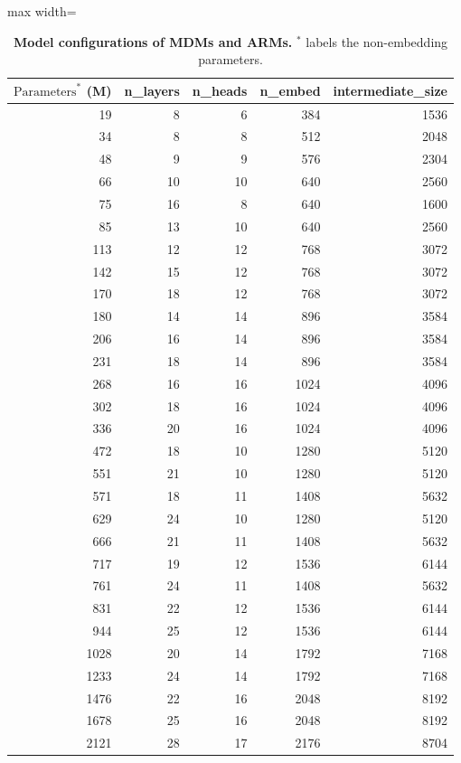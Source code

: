 \documentclass{article} %
\begin{document}
\begin{table}[t!]
    \centering
    \caption{\textbf{Model configurations of MDMs and ARMs.} $^*$ labels the non-embedding parameters.}
    \label{tab:app_model_config}
    \begin{adjustbox}{max width=\textwidth}
    \begin{tabular}{r|rrrr}
        \toprule
        $\text{Parameters}^*$ (M) & n\_layers & n\_heads & n\_embed & intermediate\_size \\
        \midrule
        19 & 8 & 6 & 384 & 1536 \\
        34 & 8 & 8 & 512 & 2048 \\
        48 & 9 & 9 & 576 & 2304 \\
        66 & 10 & 10 & 640 & 2560 \\
        75 & 16 & 8 & 640 & 1600 \\
        85 & 13 & 10 & 640 & 2560 \\
        113 & 12 & 12 & 768 & 3072 \\
        142 & 15 & 12 & 768 & 3072 \\
        170 & 18 & 12 & 768 & 3072 \\
        180 & 14 & 14 & 896 & 3584 \\
        206 & 16 & 14 & 896 & 3584 \\
        231 & 18 & 14 & 896 & 3584 \\
        268 & 16 & 16 & 1024 & 4096 \\
        302 & 18 & 16 & 1024 & 4096 \\
        336 & 20 & 16 & 1024 & 4096 \\
        472 & 18 & 10 & 1280 & 5120 \\
        551 & 21 & 10 & 1280 & 5120 \\
        571 & 18 & 11 & 1408 & 5632 \\
        629 & 24 & 10 & 1280 & 5120 \\
        666 & 21 & 11 & 1408 & 5632 \\
        717 & 19 & 12 & 1536 & 6144 \\
        761 & 24 & 11 & 1408 & 5632 \\
        831 & 22 & 12 & 1536 & 6144 \\
        944 & 25 & 12 & 1536 & 6144 \\
        1028 & 20 & 14 & 1792 & 7168 \\
        1233 & 24 & 14 & 1792 & 7168 \\
        1476 & 22 & 16 & 2048 & 8192 \\
        1678 & 25 & 16 & 2048 & 8192 \\
        2121 & 28 & 17 & 2176 & 8704 \\
        \bottomrule
    \end{tabular}
    \end{adjustbox}
\end{table}
\end{document}
